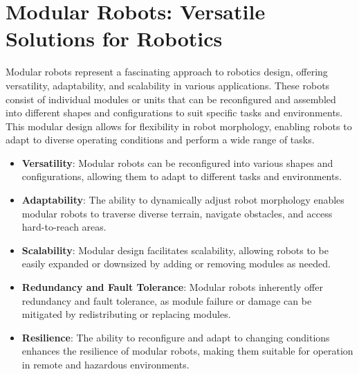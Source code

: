 \section{Modular Robots: Versatile Solutions for Robotics}

Modular robots represent a fascinating approach to robotics design, offering versatility, adaptability, and scalability in various applications. These robots consist of individual modules or units that can be reconfigured and assembled into different shapes and configurations to suit specific tasks and environments. This modular design allows for flexibility in robot morphology, enabling robots to adapt to diverse operating conditions and perform a wide range of tasks.

\begin{itemize}
    \item \textbf{Versatility}: Modular robots can be reconfigured into various shapes and configurations, allowing them to adapt to different tasks and environments.
    
    \item \textbf{Adaptability}: The ability to dynamically adjust robot morphology enables modular robots to traverse diverse terrain, navigate obstacles, and access hard-to-reach areas.
    
    \item \textbf{Scalability}: Modular design facilitates scalability, allowing robots to be easily expanded or downsized by adding or removing modules as needed.
    
    \item \textbf{Redundancy and Fault Tolerance}: Modular robots inherently offer redundancy and fault tolerance, as module failure or damage can be mitigated by redistributing or replacing modules.
    
    \item \textbf{Resilience}: The ability to reconfigure and adapt to changing conditions enhances the resilience of modular robots, making them suitable for operation in remote and hazardous environments.
\end{itemize}


